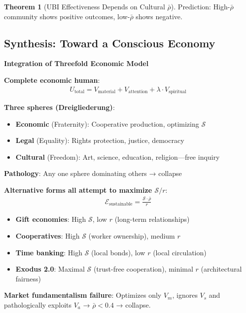\documentclass[11pt,a4paper]{article}
\theoremstyle{definition}
\newtheorem{theorem}{Theorem}[section]
\theoremstyle{remark}
\begin{document}
\begin{small}
\begin{enumerate}
\begin{theorem}[UBI Effectiveness Depends on Cultural \(\bar{\rho}\)]
Prediction: High-\(\bar{\rho}\) community shows positive outcomes, low-\(\bar{\rho}\) shows negative.
\end{theorem}

\subsection{Synthesis: Toward a Conscious Economy}

\begin{mdframed}[backgroundcolor=purple!10,linewidth=2pt]
\textbf{Integration of Threefold Economic Model}

\textbf{Complete economic human}:
\begin{align}
U_{\text{total}} = V_{\text{material}} + V_{\text{attention}} + \lambda \cdot V_{\text{spiritual}}
\end{align}

\textbf{Three spheres (Dreigliederung)}:
\begin{itemize}
    \item \textbf{Economic} (Fraternity): Cooperative production, optimizing \(\mathcal{S}\)
    \item \textbf{Legal} (Equality): Rights protection, justice, democracy
    \item \textbf{Cultural} (Freedom): Art, science, education, religion—free inquiry
\end{itemize}

\textbf{Pathology}: Any one sphere dominating others → collapse

\textbf{Alternative forms all attempt to maximize \(\mathcal{S}/r\)}:
\begin{align}
\mathcal{E}_{\text{sustainable}} = \frac{\mathcal{S} \cdot \bar{\rho}}{r}
\end{align}

\begin{itemize}
    \item \textbf{Gift economies}: High \(\mathcal{S}\), low \(r\) (long-term relationships)
    \item \textbf{Cooperatives}: High \(\mathcal{S}\) (worker ownership), medium \(r\)
    \item \textbf{Time banking}: High \(\mathcal{S}\) (local bonds), low \(r\) (local circulation)
    \item \textbf{Exodus 2.0}: Maximal \(\mathcal{S}\) (trust-free cooperation), minimal \(r\) (architectural fairness)
\end{itemize}

\textbf{Market fundamentalism failure}: Optimizes only \(V_m\), ignores \(V_s\) and pathologically exploits \(V_a\) → \(\bar{\rho} < 0.4\) → collapse.


\end{mdframed}
\end{enumerate}
\end{small}
\end{document}
